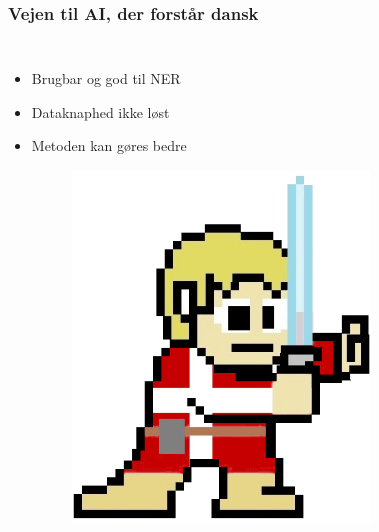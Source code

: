 \documentclass{beamer}
\begin{document}
\begin{frame}
    \frametitle{Vejen til AI, der forstår dansk}
    \begin{columns}
        \begin{itemize}
            \item Brugbar og god til NER
            \item Dataknaphed ikke løst
            \item Metoden kan gøres bedre
        \begin{figure}[H]
            \centering
                \href{https://github.com/peleiden/daLUKE}{
                    \includegraphics[width=.7\linewidth]{daluke-mascot}
                }
        \end{figure}\noindent
        \end{itemize}
        \begin{figure}[H]
            \centering

\end{figure}
\end{columns}
\end{frame}
\end{document}
